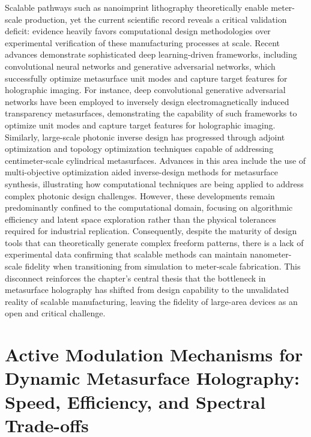 Scalable pathways such as nanoimprint lithography theoretically enable meter-scale production, yet the current scientific record reveals a critical validation deficit: evidence heavily favors computational design methodologies over experimental verification of these manufacturing processes at scale. Recent advances demonstrate sophisticated deep learning-driven frameworks, including convolutional neural networks and generative adversarial networks, which successfully optimize metasurface unit modes and capture target features for holographic imaging. For instance, deep convolutional generative adversarial networks have been employed to inversely design electromagnetically induced transparency metasurfaces, demonstrating the capability of such frameworks to optimize unit modes and capture target features for holographic imaging. \citep{doi_10_1088_1402_4896_acf007_ad71688e} Similarly, large-scale photonic inverse design has progressed through adjoint optimization and topology optimization techniques capable of addressing centimeter-scale cylindrical metasurfaces. Advances in this area include the use of multi-objective optimization aided inverse-design methods for metasurface synthesis, illustrating how computational techniques are being applied to address complex photonic design challenges. \citep{doi_10_1117_12_2529823_81c5e659} However, these developments remain predominantly confined to the computational domain, focusing on algorithmic efficiency and latent space exploration rather than the physical tolerances required for industrial replication. Consequently, despite the maturity of design tools that can theoretically generate complex freeform patterns, there is a lack of experimental data confirming that scalable methods can maintain nanometer-scale fidelity when transitioning from simulation to meter-scale fabrication. This disconnect reinforces the chapter's central thesis that the bottleneck in metasurface holography has shifted from design capability to the unvalidated reality of scalable manufacturing, leaving the fidelity of large-area devices as an open and critical challenge. \citep{doi_10_3390_photonics12100947_b44bdefd} \citep{doi_10_1515_nanoph_2024_0127_c4fd5a12}

\section{Active Modulation Mechanisms for Dynamic Metasurface Holography: Speed, Efficiency, and Spectral Trade-offs}\label{active-modulation-mechanisms-for-dynamic-metasurface-holography-speed-efficiency-and-spectral-trade-offs}

